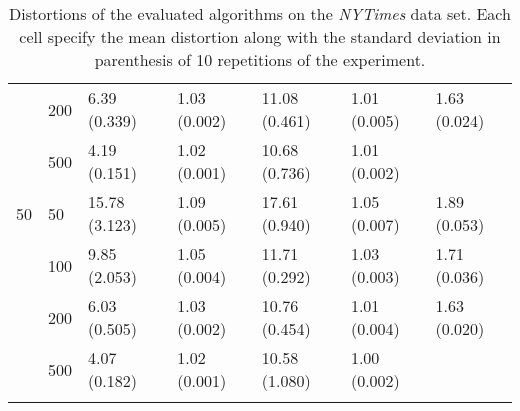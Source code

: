 \begin{longtable}{lllllll}
   & 200 &   6.39 (0.339) &   1.03 (0.002) &  11.08 (0.461) &         1.01 (0.005) &  1.63 (0.024) \\
   & 500 &   4.19 (0.151) &   1.02 (0.001) &  10.68 (0.736) &         1.01 (0.002) &  \\
 \midrule
50 & 50  &  15.78 (3.123) &   1.09 (0.005) &  17.61 (0.940) &         1.05 (0.007) &  1.89 (0.053) \\
   & 100 &   9.85 (2.053) &   1.05 (0.004) &  11.71 (0.292) &         1.03 (0.003) &  1.71 (0.036) \\
   & 200 &   6.03 (0.505) &   1.03 (0.002) &  10.76 (0.454) &         1.01 (0.004) &  1.63 (0.020) \\
   & 500 &   4.07 (0.182) &   1.02 (0.001) &  10.58 (1.080) &         1.00 (0.002) &            \\
\bottomrule
\caption{Distortions of the evaluated algorithms on the \textit{NYTimes} data set. Each cell specify the mean distortion along with the standard deviation in parenthesis of 10 repetitions of the experiment.}
\label{tab:distortions-mean-std-nytimes}
\end{longtable}

